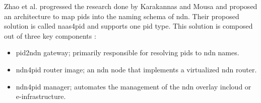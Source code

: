 Zhao et al. progressed the research done by Karakannas \cite{icn-bd} and Mousa \cite{ndn-app-aware} and proposed an architecture to map \glspl{pid} into the naming schema of \gls{ndn}. Their proposed solution is called \gls{naas4pid} and supports one \gls{pid} type. This solution is composed out of three key components \cite{koulouzis2018information}:
\begin{itemize}
  \item \gls{pid}2\gls{ndn} gateway; primarily responsible for resolving \glspl{pid} to \gls{ndn} names.
  \item \gls{ndn}4\gls{pid} router image; an \gls{ndn} node that implements a virtualized \gls{ndn} router.
  \item \gls{ndn}4\gls{pid} manager; automates the management of the \gls{ndn} overlay in\newline cloud or e-infrastructure.
\end{itemize}


